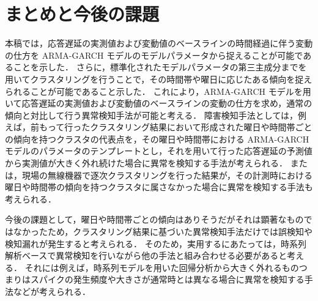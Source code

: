 \documentclass[technicalreport]{ieicej}
\begin{document}
\section{まとめと今後の課題}
本稿では，応答遅延の実測値および変動値のベースラインの時間経過に伴う変動の仕方を ARMA-GARCH モデルのモデルパラメータから捉えることが可能であることを示した．
さらに，標準化されたモデルパラメータの第三主成分までを用いてクラスタリングを行うことで，その時間帯や曜日に応じたある傾向を捉えられることが可能であること示した．
これにより，ARMA-GARCH モデルを用いて応答遅延の実測値および変動値のベースラインの変動の仕方を求め，通常の傾向と対比して行う異常検知手法が可能と考える．
障害検知手法としては，例えば，前もって行ったクラスタリング結果において形成された曜日や時間帯ごとの傾向を持つクラスタの代表点を，その曜日や時間帯における ARMA-GARCH モデルのパラメータのテンプレートとし，それを用いて行った応答遅延の予測値から実測値が大きく外れ続けた場合に異常を検知する手法が考えられる．
または，現場の無線機器で逐次クラスタリングを行った結果が，その計測時における曜日や時間帯の傾向を持つクラスタに属さなかった場合に異常を検知する手法も考えられる．

今後の課題として，曜日や時間帯ごとの傾向はありそうだがそれは顕著なものではなかったため，クラスタリング結果に基づいた異常検知手法だけでは誤検知や検知漏れが発生すると考えられる．
そのため，実用するにあたっては，時系列解析ベースで異常検知を行いながら他の手法と組み合わせる必要があると考える．
それには例えば，時系列モデルを用いた回帰分析から大きく外れるものつまりはスパイクの発生頻度や大きさが通常時とは異なる場合に異常を検知する手法などが考えられる．



\end{document}
